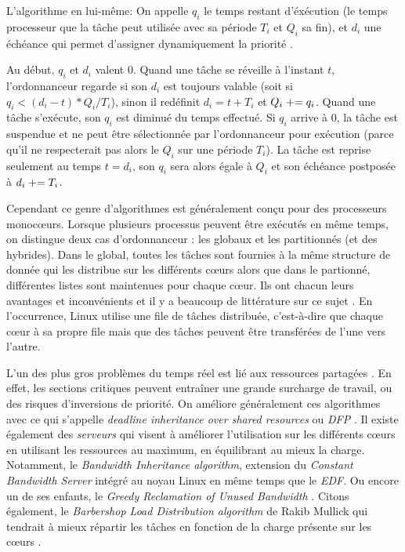 \documentclass[letterpaper]{article}
\begin{document}
L'algorithme en lui-même:
On appelle \textit{$q_i$} le temps restant d'éxécution (le temps processeur que la tâche peut utilisée avec sa période \textit{$T_i$} et \textit{$Q_i$} sa fin), et \textit{$d_i$} une échéance qui permet d'assigner dynamiquement la priorité \citep{LelliEDFLinux}.

Au début, \textit{$q_i$} et \textit{$d_i$} valent 0.
Quand une tâche se réveille à l'instant $t$, l'ordonnanceur regarde si son $d_i$ est toujours valable (soit si $q_i < (d_i - t) * Q_i/ T_i$), sinon il redéfinit $d_i = t + T_i$ et $Q_i \mathrel{+}= q_i$. Quand une tâche s'exécute, son $q_i$ est diminué du temps effectué. Si $q_i$ arrive à 0, la tâche est suspendue et ne peut être sélectionnée par l'ordonnanceur pour exécution (parce qu'il ne respecterait pas alors le $Q_i$ sur une période $T_i$). La tâche est reprise seulement au temps $t = d_i$, son $q_i$ sera alors égale à $Q_i$ et son échéance postposée à $d_i \mathrel{+}= T_i$.

Cependant ce genre d'algorithmes est généralement conçu pour des processeurs monocœurs. Lorsque plusieurs processus peuvent être exécutés en même temps, on distingue deux cas d'ordonnanceur \citep{faggioli2009implementation}: les globaux et les partitionnés (et des hybrides). Dans le global, toutes les tâches sont fournies à la même structure de donnée qui les distribue sur les différents cœurs alors que dans le partionné, différentes listes sont maintenues pour chaque cœur. Ils ont chacun leurs avantages et inconvénients et il y a beaucoup de littérature sur ce sujet \citep{bastoni2010empirical, lelli2012experimental}.
En l'occurrence, Linux utilise une file de tâches distribuée, c'est-à-dire que chaque cœur à sa propre file mais que des tâches peuvent être transférées de l'une vers l'autre.

L'un des plus gros problèmes du temps réel est lié aux ressources partagées \citep{buttazzo2011hard}. En effet, les sections critiques peuvent entraîner une grande surcharge de travail, ou des risques d'inversions de priorité. On améliore généralement ces algorithmes avec ce qui s'appelle \textit{deadline inheritance over shared resources} ou \textit{DFP} \citep{jansen2003lightweight}. Il existe également des \textit{serveurs} qui visent à améliorer l'utilisation sur les différents cœurs en utilisant les ressources au maximum, en équilibrant au mieux la charge. Notamment, le \textit{Bandwidth Inheritance algorithm}, extension du \textit{Constant Bandwidth Server} \citep{Abeni:1998:IMA:827270.829047} intégré au noyau Linux en même temps que le \textit{EDF}. Ou encore un de ses enfants, le \textit{Greedy Reclamation of Unused Bandwidth} \citep{Lipari:2000:GRU:1947412.1947445}. Citons également, le \textit{Barbershop Load
Distribution algorithm} de Rakib Mullick qui tendrait à mieux répartir les tâches en fonction de la charge présente sur les cœurs \citep{BarbershopLoadDistribution}.
\end{document}
